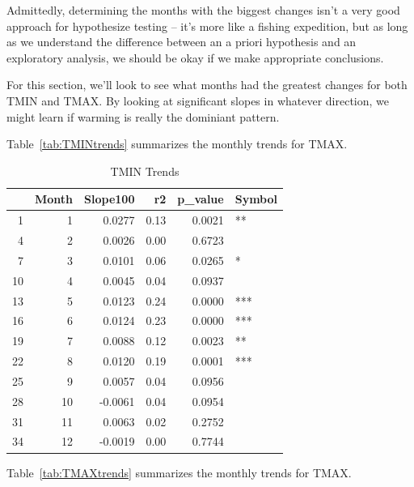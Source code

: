 \documentclass{article}\usepackage[]{graphicx}\usepackage[]{color}
\begin{document}
Admittedly, determining the months with the biggest changes isn't a very good approach for hypothesize testing -- it's more like a fishing expedition, but as long as we understand the difference between an a priori hypothesis and an exploratory analysis, we should be okay if we make appropriate conclusions. 



For this section, we'll look to see what months had the greatest changes for both TMIN and TMAX. By looking at significant slopes in whatever direction, we might learn if warming is really the dominiant pattern. 

Table~\ref{tab:TMINtrends} summarizes the monthly trends for TMAX.

\begin{table}[ht]
\centering
\begin{tabular}{rrrrrl}
  \hline
 & Month & Slope100 & r2 & p\_value & Symbol \\ 
  \hline
1 & 1 & 0.0277 & 0.13 & 0.0021 & ** \\ 
  4 & 2 & 0.0026 & 0.00 & 0.6723 &  \\ 
  7 & 3 & 0.0101 & 0.06 & 0.0265 & * \\ 
  10 & 4 & 0.0045 & 0.04 & 0.0937 &  \\ 
  13 & 5 & 0.0123 & 0.24 & 0.0000 & *** \\ 
  16 & 6 & 0.0124 & 0.23 & 0.0000 & *** \\ 
  19 & 7 & 0.0088 & 0.12 & 0.0023 & ** \\ 
  22 & 8 & 0.0120 & 0.19 & 0.0001 & *** \\ 
  25 & 9 & 0.0057 & 0.04 & 0.0956 &  \\ 
  28 & 10 & -0.0061 & 0.04 & 0.0954 &  \\ 
  31 & 11 & 0.0063 & 0.02 & 0.2752 &  \\ 
  34 & 12 & -0.0019 & 0.00 & 0.7744 &  \\ 
   \hline
\end{tabular}
\caption{TMIN Trends} 
\end{table}


Table~\ref{tab:TMAXtrends} summarizes the monthly trends for TMAX.
\end{document}
